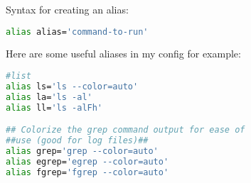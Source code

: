 \documentclass[12pt, letterpaper]{report}
\begin{document}
Syntax for creating an alias:
\begin{lstlisting}[language=Bash,framexleftmargin=5mm,frame=single,xleftmargin=18pt]
alias alias='command-to-run'
\end{lstlisting}

Here are some useful aliases in my config for example:
\begin{lstlisting}[language=Bash,framexleftmargin=5mm,frame=single,xleftmargin=18pt]
#list
alias ls='ls --color=auto'
alias la='ls -al'
alias ll='ls -alFh'

## Colorize the grep command output for ease of 
##use (good for log files)##
alias grep='grep --color=auto'
alias egrep='egrep --color=auto'
alias fgrep='fgrep --color=auto'
\end{lstlisting}
\end{document}
